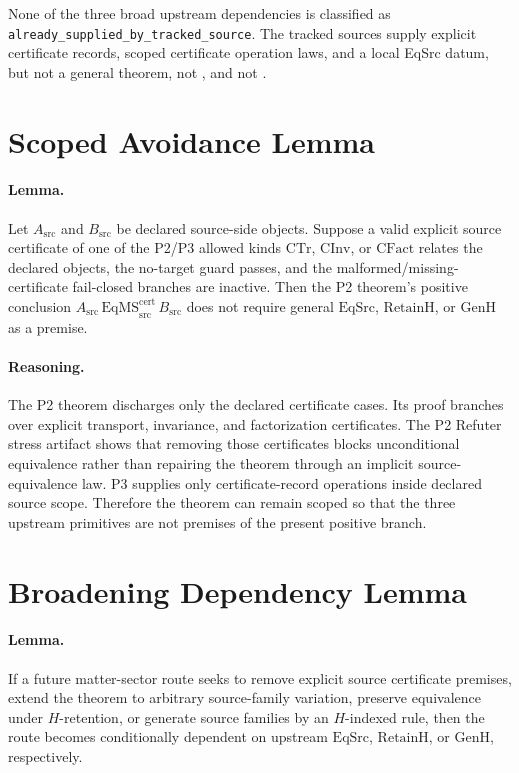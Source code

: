 \documentclass[11pt]{article}
\newcommand{\EqSrc}{\mathrm{EqSrc}}
\newcommand{\RetainH}{\mathrm{RetainH}}
\newcommand{\GenH}{\mathrm{GenH}}
\newcommand{\EqMScert}{\mathrm{EqMS}^{\mathrm{cert}}_{\mathrm{src}}}
\newcommand{\CTr}{\mathrm{CTr}}
\newcommand{\CInv}{\mathrm{CInv}}
\newcommand{\CFact}{\mathrm{CFact}}
\begin{document}
None of the three broad upstream dependencies is classified as
\texttt{already\_supplied\_by\_tracked\_source}. The tracked sources supply
explicit certificate records, scoped certificate operation laws, and a local
EqSrc datum, but not a general \EqSrc theorem, not \RetainH, and not \GenH.

\section*{Scoped Avoidance Lemma}

\paragraph{Lemma.}
Let \(A_{\mathrm{src}}\) and \(B_{\mathrm{src}}\) be declared source-side
objects. Suppose a valid explicit source certificate of one of the P2/P3
allowed kinds \(\CTr\), \(\CInv\), or \(\CFact\) relates the declared objects,
the no-target guard passes, and the malformed/missing-certificate fail-closed
branches are inactive. Then the P2 theorem's positive conclusion
\(A_{\mathrm{src}} \,\EqMScert\, B_{\mathrm{src}}\) does not require general
\(\EqSrc\), \(\RetainH\), or \(\GenH\) as a premise.

\paragraph{Reasoning.}
The P2 theorem discharges only the declared certificate cases. Its proof
branches over explicit transport, invariance, and factorization certificates.
The P2 Refuter stress artifact shows that removing those certificates blocks
unconditional equivalence rather than repairing the theorem through an
implicit source-equivalence law. P3 supplies only certificate-record operations
inside declared source scope. Therefore the theorem can remain scoped so that
the three upstream primitives are not premises of the present positive branch.

\section*{Broadening Dependency Lemma}

\paragraph{Lemma.}
If a future matter-sector route seeks to remove explicit source certificate
premises, extend the theorem to arbitrary source-family variation, preserve
equivalence under \(H\)-retention, or generate source families by an
\(H\)-indexed rule, then the route becomes conditionally dependent on upstream
\(\EqSrc\), \(\RetainH\), or \(\GenH\), respectively.
\end{document}
